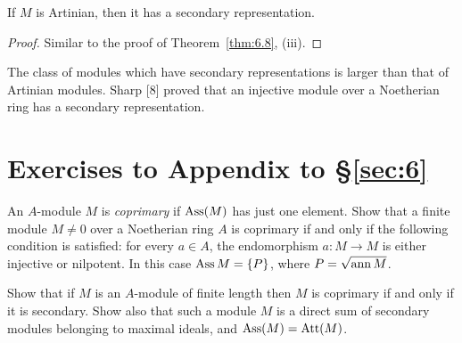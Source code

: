 \begin{theorem}\label{thm:6.11}
If $M$ is Artinian, then it has a secondary representation.
\end{theorem}

\begin{proof}
Similar to the proof of Theorem~\ref{thm:6.8}, (iii).
\end{proof}

The class of modules which have secondary representations is larger
than that of Artinian modules. Sharp [8] proved that an injective module
over a Noetherian ring has a secondary representation.

\section*{Exercises to Appendix to \S\ref{sec:6}}

\begin{exercise}\label{ex:6.8-ex}
An $A$-module $M$ is \emph{coprimary} if $\operatorname{Ass}(M)$ has just one element. Show that a
finite module $M \neq 0$ over a Noetherian ring $A$ is coprimary if and only if
the following condition is satisfied: for every $a \in A$, the endomorphism
$a\colon M \to M$ is either injective or nilpotent. In this case $\operatorname{Ass} M = \{P\}$,
where $P = \sqrt{\operatorname{ann} M}$.
\end{exercise}

\begin{exercise}\label{ex:6.9-ex}
Show that if $M$ is an $A$-module of finite length then $M$ is coprimary if and
only if it is secondary. Show also that such a module $M$ is a direct sum of
secondary modules belonging to maximal ideals, and $\operatorname{Ass}(M) = \operatorname{Att}(M)$.
\end{exercise}
